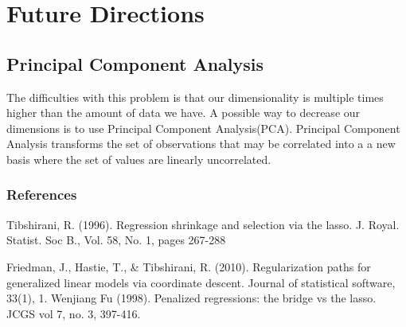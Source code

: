 \documentclass{article} %
\begin{document}
\section{Future Directions}


\subsection{Principal Component Analysis}
The difficulties with this problem is that our dimensionality is multiple times higher than the amount of data we have. A possible way to decrease our dimensions is to use Principal Component Analysis(PCA).  Principal Component Analysis transforms the set of observations that may be correlated into a a new basis where the set of values are linearly uncorrelated.



\subsubsection*{References}

\small{
Tibshirani, R. (1996). Regression shrinkage and selection via the lasso. J. Royal. Statist. Soc B., Vol. 58, No. 1, pages 267-288

Friedman, J., Hastie, T., \& Tibshirani, R. (2010). Regularization paths for generalized linear models via coordinate descent. Journal of statistical software, 33(1), 1.
Wenjiang Fu (1998). Penalized regressions: the bridge vs the lasso. JCGS vol 7, no. 3, 397-416.
}
\end{document}
